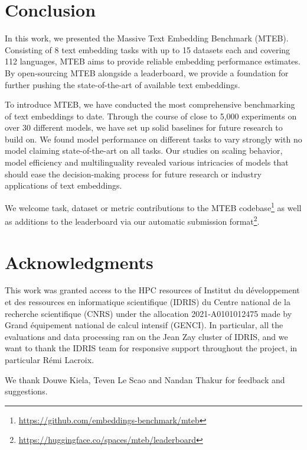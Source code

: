 \documentclass[11pt]{article}
\begin{document}
\section{Conclusion}

In this work, we presented the Massive Text Embedding Benchmark (MTEB). Consisting of 8 text embedding tasks with up to 15 datasets each and covering 112 languages, MTEB aims to provide reliable embedding performance estimates. By open-sourcing MTEB alongside a leaderboard, we provide a foundation for further pushing the state-of-the-art of available text embeddings.

To introduce MTEB, we have conducted the most comprehensive benchmarking of text embeddings to date. Through the course of close to 5,000 experiments on over 30 different models, we have set up solid baselines for future research to build on. We found model performance on different tasks to vary strongly with no model claiming state-of-the-art on all tasks. Our studies on scaling behavior, model efficiency and multilinguality revealed various intricacies of models that should ease the decision-making process for future research or industry applications of text embeddings.

We welcome task, dataset or metric contributions to the MTEB codebase\footnote{\url{https://github.com/embeddings-benchmark/mteb}} as well as additions to the leaderboard via our automatic submission format\footnote{\url{https://huggingface.co/spaces/mteb/leaderboard}}.

\newpage

\section*{Acknowledgments}

This work was granted access to the HPC resources of Institut du d\'eveloppement et des ressources en informatique scientifique (IDRIS) du Centre national de la recherche scientifique (CNRS) under the allocation 2021-A0101012475 made by Grand \'equipement national de calcul intensif (GENCI). In particular, all the evaluations and data processing ran on the Jean Zay cluster of IDRIS, and we want to thank the IDRIS team for responsive support throughout the project, in particular R\'emi Lacroix.

We thank Douwe Kiela, Teven Le Scao and Nandan Thakur for feedback and suggestions.



\end{document}
